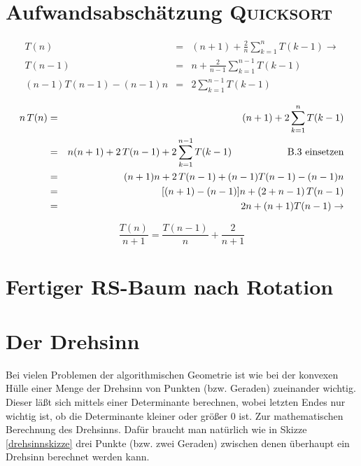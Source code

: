 \documentclass{scrreprt}%
\theoremstyle{break}
\begin{document}
\section{Aufwandsabschätzung \textsc{Quicksort}}
\label{quicksort}

\begin{eqnarray}
T(n) & = & (n+1)+ \frac{2}{n} \sum_{k=1}^nT(k-1) \rightarrow\\
T(n-1) & = & n+\frac{2}{n-1} \sum_{k=1}^{n-1}T(k-1)\\
(n-1)T(n-1) - (n-1)n & = & 2\sum_{k=1}^{n-1}T(k-1)
\end{eqnarray}

\begin{eqnarray*}
n\, T(n) & = & (n+1)+ 2 \sum_{k=1}^nT(k-1)\\
& = & n(n+1)+2\, T(n-1) +2 \sum_{k=1}^{n-1}T(k-1) \hspace{2cm} \textup{B.3 einsetzen}\\
& = & (n+1)n+2\, T(n-1) + (n-1)T(n-1) -(n-1)n\\
& = & [(n+1)-(n-1)]n+(2+n-1)\, T(n-1)\\
& = & 2n+(n+1)T(n-1) \rightarrow 
\end{eqnarray*}

\begin{displaymath}
\frac{T(n)}{n+1}= \frac{T(n-1)}{n}+ \frac{2}{n+1}	
\end{displaymath}

\section{Fertiger RS-Baum nach Rotation}
\label{rsrotation}
\begin{figure}[H]
\begin{center}

\end{center}
\end{figure}

\section{Der Drehsinn} \label{drehsinn}
Bei vielen Problemen der algorithmischen Geometrie ist wie bei der konvexen Hülle einer Menge der Drehsinn von Punkten (bzw. Geraden) zueinander wichtig.
Dieser läßt sich mittels einer Determinante berechnen, wobei letzten Endes nur wichtig ist, ob die Determinante kleiner oder größer
0 ist. Zur
mathematischen Berechnung des Drehsinns. Dafür braucht man natürlich wie in Skizze
\ref{drehsinnskizze} drei Punkte (bzw. zwei Geraden) zwischen denen überhaupt ein Drehsinn berechnet werden kann.
\end{document}
